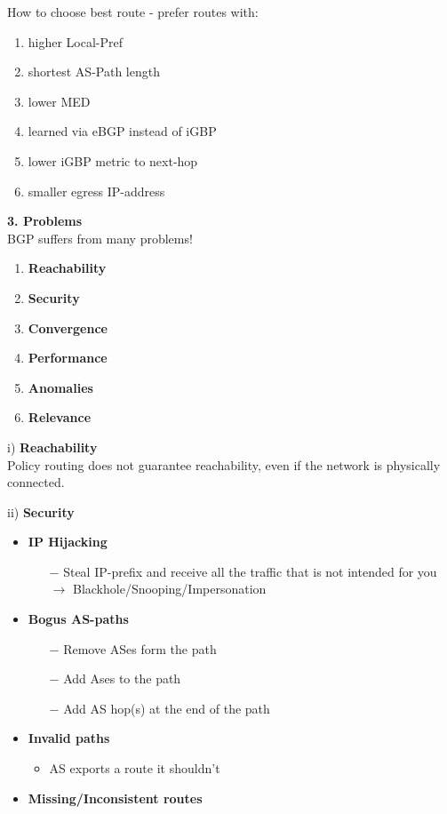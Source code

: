 \documentclass[a4paper, fontsize=8pt, landscape, DIV=1]{scrartcl}
\begin{document}
\begin{multicols*}{4}
		\par 
		How to choose best route - prefer routes with:
		\vspace{-0.2cm} 
		\begin{enumerate}[noitemsep]
			\item higher Local-Pref
			\item shortest AS-Path length
			\item lower MED
			\item learned via eBGP instead of iGBP
			\item lower iGBP metric to next-hop
			\item smaller egress IP-address
		\end{enumerate}
		\par 
		\textbf{3. Problems}\\
		BGP suffers from many problems!
		\begin{enumerate}[label=(\roman*), noitemsep]
			\item \textbf{Reachability}
			\item \textbf{Security}
			\item \textbf{Convergence} 
			\item \textbf{Performance} 
			\item \textbf{Anomalies}
			\item \textbf{Relevance} 
		\end{enumerate}
	    i) \textbf{Reachability}\\
		Policy routing does not guarantee reachability, even if the network is physically connected.\par 
		
		ii) \textbf{Security}
		\vspace{-0.2cm}
		 \begin{itemize}[noitemsep]
		 	\item \textbf{IP Hijacking}
			\begin{itemize}
				\item[$-$] Steal IP-prefix and receive all the traffic that is not intended for you $\rightarrow$ Blackhole/Snooping/Impersonation 
			\end{itemize}
			\item \textbf{Bogus AS-paths}
			\begin{itemize}
				\item[$-$] Remove ASes form the path
				\item[$-$] Add Ases to the path
				\item[$-$] Add AS hop(s) at the end of the path
			\end{itemize}
			\item \textbf{Invalid paths}
			\begin{itemize}
				\item AS exports a route it shouldn't
			\end{itemize}
			\item \textbf{ Missing/Inconsistent routes}	
		\end{itemize}
		\par
		 

\end{multicols*}
\end{document}
